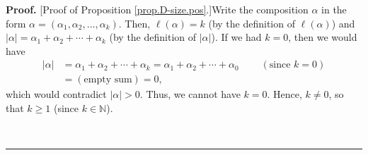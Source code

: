\documentclass[numbers=enddot,12pt,final,onecolumn,notitlepage]{scrartcl}%
\theoremstyle{definition}
\newenvironment{proof}[1][Proof]{\noindent\textbf{#1.} }{\ \rule{0.5em}{0.5em}}
\begin{document}
\begin{proof}
[Proof of Proposition \ref{prop.D-size.pos}.]Write the composition $\alpha$ in
the form $\alpha=\left(  \alpha_{1},\alpha_{2},\ldots,\alpha_{k}\right)  $.
Then, $\ell\left(  \alpha\right)  =k$ (by the definition of $\ell\left(
\alpha\right)  $) and $\left\vert \alpha\right\vert =\alpha_{1}+\alpha
_{2}+\cdots+\alpha_{k}$ (by the definition of $\left\vert \alpha\right\vert
$). If we had $k=0$, then we would have%
\begin{align*}
\left\vert \alpha\right\vert  &  =\alpha_{1}+\alpha_{2}+\cdots+\alpha
_{k}=\alpha_{1}+\alpha_{2}+\cdots+\alpha_{0}\ \ \ \ \ \ \ \ \ \ \left(
\text{since }k=0\right) \\
&  =\left(  \text{empty sum}\right)  =0,
\end{align*}
which would contradict $\left\vert \alpha\right\vert >0$. Thus, we cannot have
$k=0$. Hence, $k\neq0$, so that $k\geq1$ (since $k\in\mathbb{N}$).


\end{proof}
\end{document}
